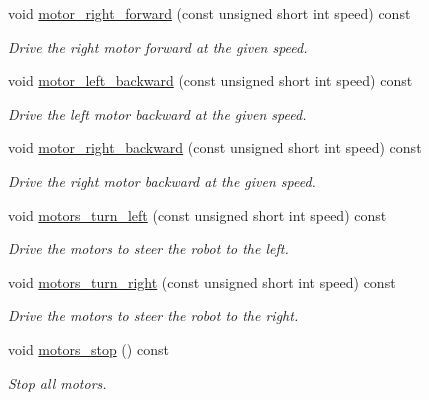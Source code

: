 \begin{DoxyCompactItemize}
void \hyperlink{classIDP_1_1HardwareAbstractionLayer_a2b0e3948f124ba41ef711a83e79cd5a3}{motor\_\-right\_\-forward} (const unsigned short int speed) const 
\begin{DoxyCompactList}\small\item\em Drive the right motor forward at the given speed. \item\end{DoxyCompactList}\item 
void \hyperlink{classIDP_1_1HardwareAbstractionLayer_a2e804836935e0d66e813f68c09ca3cd1}{motor\_\-left\_\-backward} (const unsigned short int speed) const 
\begin{DoxyCompactList}\small\item\em Drive the left motor backward at the given speed. \item\end{DoxyCompactList}\item 
void \hyperlink{classIDP_1_1HardwareAbstractionLayer_ae7253b2277bc9252c1477e6b71bb0122}{motor\_\-right\_\-backward} (const unsigned short int speed) const 
\begin{DoxyCompactList}\small\item\em Drive the right motor backward at the given speed. \item\end{DoxyCompactList}\item 
void \hyperlink{classIDP_1_1HardwareAbstractionLayer_adeb07393ffab83877500183162c0bed2}{motors\_\-turn\_\-left} (const unsigned short int speed) const 
\begin{DoxyCompactList}\small\item\em Drive the motors to steer the robot to the left. \item\end{DoxyCompactList}\item 
void \hyperlink{classIDP_1_1HardwareAbstractionLayer_abf4317f045b498e7e67aff208fa8d519}{motors\_\-turn\_\-right} (const unsigned short int speed) const 
\begin{DoxyCompactList}\small\item\em Drive the motors to steer the robot to the right. \item\end{DoxyCompactList}\item 
void \hyperlink{classIDP_1_1HardwareAbstractionLayer_a186e188450a83ec4174670e1eb6c40bb}{motors\_\-stop} () const 
\begin{DoxyCompactList}\small\item\em Stop all motors. \item\end{DoxyCompactList}\item 

\end{DoxyCompactItemize}
